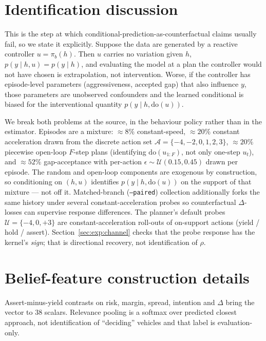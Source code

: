 \documentclass[conference]{IEEEtran}
\begin{document}
\section{Identification discussion}
\label{app:identification}

This is the step at which conditional-prediction-as-counterfactual claims
usually fail, so we state it explicitly. Suppose the data are generated by a
reactive controller $u = \pi_b(h)$. Then $u$ carries no variation given $h$,
$p(y \mid h, u) = p(y \mid h)$, and evaluating the model at a plan the
controller would not have chosen is extrapolation, not intervention. Worse, if
the controller has episode-level parameters (aggressiveness, accepted gap) that
also influence $y$, those parameters are unobserved confounders and the learned
conditional is biased for the interventional quantity $p(y \mid h, \mathrm{do}(u))$.

We break both problems at the source, in the behaviour policy rather than in the
estimator. Episodes are a mixture: $\approx 8\%$ constant-speed,
$\approx 20\%$ constant acceleration drawn from the discrete action set
$\mathcal{A}=\{-4,-2,0,1,2,3\}$, $\approx 20\%$ piecewise open-loop $F$-step
plans (identifying $\mathrm{do}(u_{1:F})$, not only one-step $u_t$), and
$\approx 52\%$ gap-acceptance with per-action
$\epsilon\sim\mathcal{U}(0.15,0.45)$ drawn per episode. The random and
open-loop components are exogenous by construction, so conditioning on $(h,u)$
identifies $p(y \mid h, \mathrm{do}(u))$ on the support of that mixture --- not
off it. Matched-branch (\texttt{--paired}) collection additionally forks the
same history under several constant-acceleration probes so counterfactual
$\Delta$-losses can supervise response differences. The planner's default
probes $\mathcal{U}=\{-4,0,+3\}$ are constant-acceleration roll-outs of
on-support actions (yield / hold / assert).
Section~\ref{sec:exp:channel} checks that the probe response has the kernel's
\emph{sign}; that is directional recovery, not identification of $\rho$.

\section{Belief-feature construction details}
\label{app:Belief}

Assert-minus-yield contrasts on risk, margin, spread, intention and $\Delta$ bring the vector to $38$ scalars. Relevance pooling is a softmax over predicted closest approach, not identification of ``deciding'' vehicles and that label is evaluation-only.
\end{document}

